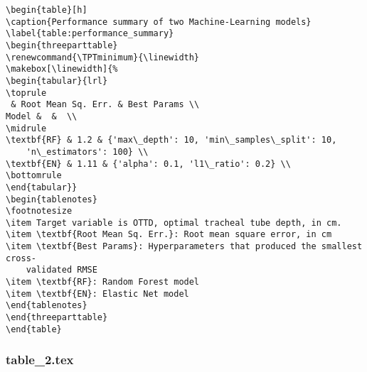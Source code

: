 \documentclass[11pt]{article}
\begin{document}
\begin{Verbatim}[tabsize=4]
\begin{table}[h]
\caption{Performance summary of two Machine-Learning models}
\label{table:performance_summary}
\begin{threeparttable}
\renewcommand{\TPTminimum}{\linewidth}
\makebox[\linewidth]{%
\begin{tabular}{lrl}
\toprule
 & Root Mean Sq. Err. & Best Params \\
Model &  &  \\
\midrule
\textbf{RF} & 1.2 & {'max\_depth': 10, 'min\_samples\_split': 10,
	'n\_estimators': 100} \\
\textbf{EN} & 1.11 & {'alpha': 0.1, 'l1\_ratio': 0.2} \\
\bottomrule
\end{tabular}}
\begin{tablenotes}
\footnotesize
\item Target variable is OTTD, optimal tracheal tube depth, in cm.
\item \textbf{Root Mean Sq. Err.}: Root mean square error, in cm
\item \textbf{Best Params}: Hyperparameters that produced the smallest cross-
	validated RMSE
\item \textbf{RF}: Random Forest model
\item \textbf{EN}: Elastic Net model
\end{tablenotes}
\end{threeparttable}
\end{table}

\end{Verbatim}

\subsubsection*{table\_2.tex}
\end{document}
